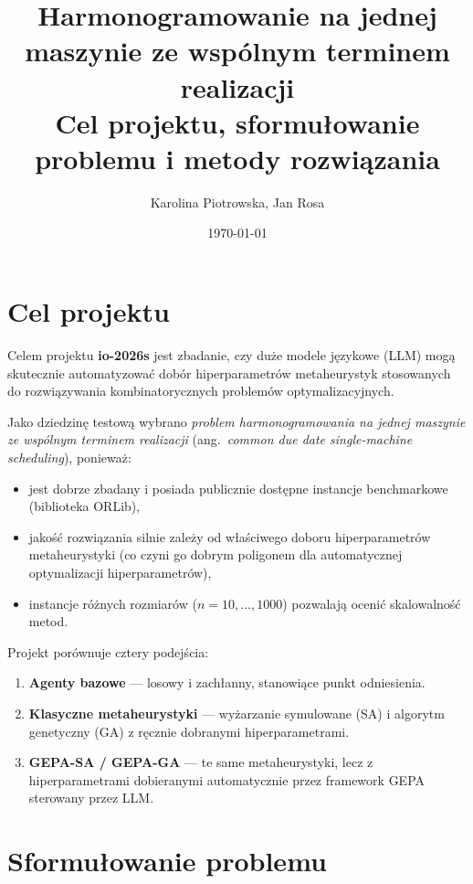 \documentclass[11pt,a4paper]{article}
\title{\textbf{Harmonogramowanie na jednej maszynie ze wspólnym terminem realizacji}\\[4pt]
    \large Cel projektu, sformułowanie problemu i metody rozwiązania}
\author{Karolina Piotrowska, Jan Rosa}
\date{\today}
\begin{document}
\maketitle
\tableofcontents
\newpage

\section{Cel projektu}

Celem projektu \textbf{io-2026s} jest zbadanie, czy duże modele językowe (LLM)
mogą skutecznie automatyzować dobór hiperparametrów metaheurystyk stosowanych
do rozwiązywania kombinatorycznych problemów optymalizacyjnych.

Jako dziedzinę testową wybrano \emph{problem harmonogramowania na jednej
maszynie ze wspólnym terminem realizacji} (ang.\ \emph{common due date
single-machine scheduling}), ponieważ:
\begin{itemize}
  \item jest dobrze zbadany i posiada publicznie dostępne instancje
        benchmarkowe (biblioteka ORLib),
  \item jakość rozwiązania silnie zależy od właściwego doboru hiperparametrów
        metaheurystyki (co czyni go dobrym poligonem dla automatycznej
        optymalizacji hiperparametrów),
  \item instancje różnych rozmiarów ($n = 10, \ldots, 1000$) pozwalają ocenić
        skalowalność metod.
\end{itemize}

Projekt porównuje cztery podejścia:
\begin{enumerate}[label=\arabic*.]
  \item \textbf{Agenty bazowe} — losowy i zachłanny, stanowiące punkt odniesienia.
  \item \textbf{Klasyczne metaheurystyki} — wyżarzanie symulowane (SA)
        i algorytm genetyczny (GA) z ręcznie dobranymi hiperparametrami.
  \item \textbf{GEPA-SA / GEPA-GA} — te same metaheurystyki, lecz z
        hiperparametrami dobieranymi automatycznie przez framework GEPA
        sterowany przez LLM.
\end{enumerate}

\section{Sformułowanie problemu}
\end{document}
